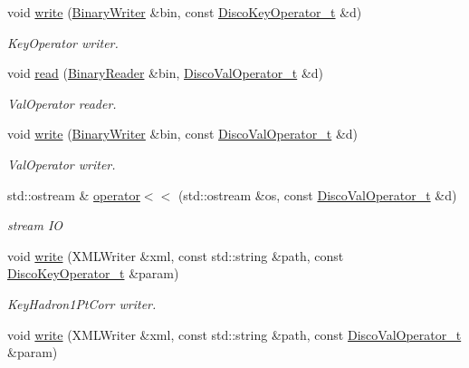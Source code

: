 \begin{DoxyCompactItemize}
void \mbox{\hyperlink{namespaceFF_a5c3e38934ee51ae23bc9d39dca34acc1}{write}} (\mbox{\hyperlink{classADATIO_1_1BinaryWriter}{Binary\+Writer}} \&bin, const \mbox{\hyperlink{structFF_1_1DiscoKeyOperator__t}{Disco\+Key\+Operator\+\_\+t}} \&d)
\begin{DoxyCompactList}\small\item\em Key\+Operator writer. \end{DoxyCompactList}\item 
void \mbox{\hyperlink{namespaceFF_adbbf0211a7578841555412497b4f18c4}{read}} (\mbox{\hyperlink{classADATIO_1_1BinaryReader}{Binary\+Reader}} \&bin, \mbox{\hyperlink{classFF_1_1DiscoValOperator__t}{Disco\+Val\+Operator\+\_\+t}} \&d)
\begin{DoxyCompactList}\small\item\em Val\+Operator reader. \end{DoxyCompactList}\item 
void \mbox{\hyperlink{namespaceFF_a6906b2ce111930a390f4a8e81b1730b6}{write}} (\mbox{\hyperlink{classADATIO_1_1BinaryWriter}{Binary\+Writer}} \&bin, const \mbox{\hyperlink{classFF_1_1DiscoValOperator__t}{Disco\+Val\+Operator\+\_\+t}} \&d)
\begin{DoxyCompactList}\small\item\em Val\+Operator writer. \end{DoxyCompactList}\item 
std\+::ostream \& \mbox{\hyperlink{namespaceFF_a16521aca33d733f874a91677f71769e5}{operator$<$$<$}} (std\+::ostream \&os, const \mbox{\hyperlink{classFF_1_1DiscoValOperator__t}{Disco\+Val\+Operator\+\_\+t}} \&d)
\begin{DoxyCompactList}\small\item\em stream IO \end{DoxyCompactList}\item 
void \mbox{\hyperlink{namespaceFF_a831b58b450a964b114e0fce65fc4de99}{write}} (X\+M\+L\+Writer \&xml, const std\+::string \&path, const \mbox{\hyperlink{structFF_1_1DiscoKeyOperator__t}{Disco\+Key\+Operator\+\_\+t}} \&param)
\begin{DoxyCompactList}\small\item\em Key\+Hadron1\+Pt\+Corr writer. \end{DoxyCompactList}\item 
void \mbox{\hyperlink{namespaceFF_a941e3f6fd9d8acd3d0c6b1f03c4be71b}{write}} (X\+M\+L\+Writer \&xml, const std\+::string \&path, const \mbox{\hyperlink{classFF_1_1DiscoValOperator__t}{Disco\+Val\+Operator\+\_\+t}} \&param)

\end{DoxyCompactItemize}
